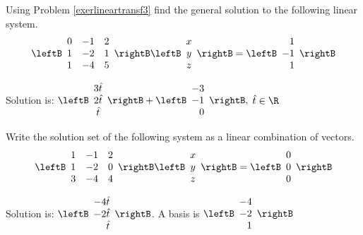 \begin{enumialphparenastyle}
\begin{ex} Using Problem \ref{exerlineartransf3} find the general solution to the following
linear system. 
\begin{equation*}
\leftB
\begin{array}{rrr}
0 & -1 & 2 \\
1 & -2 & 1 \\
1 & -4 & 5
\end{array}
\rightB \leftB
\begin{array}{c}
x \\
y \\
z
\end{array}
\rightB =\leftB
\begin{array}{r}
1 \\
-1 \\
1
\end{array}
\rightB 
\end{equation*}
\begin{sol}
Solution is: $\leftB
\begin{array}{c}
3\hat{t} \\
2\hat{t} \\
\hat{t}
\end{array}
\rightB +\leftB
\begin{array}{r}
-3 \\
-1 \\
0
\end{array}
\rightB ,$ $\hat{t}\in \R$
\end{sol}
\end{ex}

\begin{ex} \label{exerlineartransf4}Write the solution set of the following system as a linear combination of vectors.
\begin{equation*}
\leftB
\begin{array}{rrr}
1 & -1 & 2 \\
1 & -2 & 0 \\
3 & -4 & 4
\end{array}
\rightB \leftB
\begin{array}{c}
x \\
y \\
z
\end{array}
\rightB =\leftB
\begin{array}{r}
0 \\
0 \\
0
\end{array}
\rightB 
\end{equation*}
\begin{sol}
Solution is: $\leftB
\begin{array}{r}
-4\hat{t} \\
-2\hat{t} \\
\hat{t}
\end{array}
\rightB $. A basis is $\leftB
\begin{array}{r}
-4 \\
-2 \\
1
\end{array}
\rightB $
\end{sol}
\end{ex}


\end{enumialphparenastyle}
